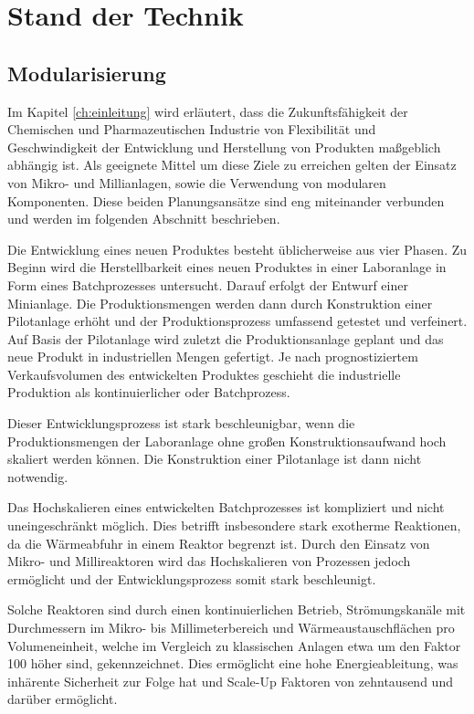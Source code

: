 \chapter{Stand der Technik} \label{ch:sdt}
\section{Modularisierung}
Im Kapitel \ref{ch:einleitung} wird erl\"autert, dass die Zukunftsf\"ahigkeit der Chemischen und Pharmazeutischen Industrie von Flexibilit\"at und Geschwindigkeit der Entwicklung und Herstellung von Produkten ma\ss{}geblich abh\"angig ist. Als geeignete Mittel um diese Ziele zu erreichen gelten der Einsatz von Mikro- und Millianlagen, sowie die Verwendung von modularen Komponenten. Diese beiden Planungsans\"atze sind eng miteinander verbunden und werden im folgenden Abschnitt beschrieben.  


Die Entwicklung eines neuen Produktes besteht \"ublicherweise aus vier Phasen. Zu Beginn wird die Herstellbarkeit eines neuen Produktes in einer Laboranlage in Form eines Batchprozesses untersucht. Darauf erfolgt der Entwurf einer Minianlage. Die Produktionsmengen werden dann durch Konstruktion einer Pilotanlage erh\"oht und der Produktionsprozess umfassend getestet und verfeinert. Auf Basis der Pilotanlage wird zuletzt die Produktionsanlage geplant und das neue Produkt in industriellen Mengen gefertigt. Je nach prognostiziertem Verkaufsvolumen des entwickelten Produktes geschieht die industrielle Produktion als kontinuierlicher oder Batchprozess. \cite{Grundemann_2012}

Dieser  Entwicklungsprozess ist stark beschleunigbar, wenn die Produktionsmengen der Laboranlage ohne gro\ss{}en Konstruktionsaufwand hoch skaliert werden k\"onnen. Die Konstruktion einer Pilotanlage ist dann nicht notwendig.

Das Hochskalieren eines entwickelten Batchprozesses ist kompliziert und nicht uneingeschr\"ankt m\"oglich. Dies betrifft insbesondere stark exotherme Reaktionen, da die W\"armeabfuhr in einem Reaktor begrenzt ist. \cite{Brodhagen_2012} \linebreak
Durch den Einsatz von Mikro- und Millireaktoren wird das Hochskalieren von Prozessen jedoch erm\"oglicht und der Entwicklungsprozess somit stark beschleunigt. \cite{Grundemann_2012, Brodhagen_2012, Helling_2012, Kockmann_2012, Hessel_2012}

Solche Reaktoren sind durch einen kontinuierlichen Betrieb, Str\"omungskan\"ale mit Durchmessern im Mikro- bis Millimeterbereich und W\"armeaustauschfl\"achen pro Volumeneinheit, welche im Vergleich zu klassischen Anlagen etwa um den Faktor 100 h\"oher sind, gekennzeichnet. Dies erm\"oglicht eine hohe Energieableitung, was inh\"arente Sicherheit zur Folge hat und Scale-Up Faktoren von zehntausend und dar\"uber erm\"oglicht. \cite{Brodhagen_2012, Kockmann_2012a,Behr_2012}

